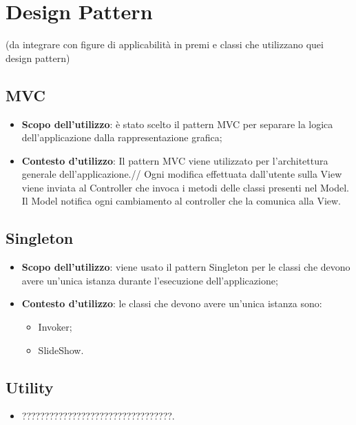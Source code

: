 \section{Design Pattern}{
	(da integrare con figure di applicabilità in premi e classi che utilizzano quei design pattern)
	\begin{figure}
	\end{figure}
	\subsection{MVC}{
			\begin{itemize}
				\item \textbf{Scopo dell’utilizzo}: è stato scelto il pattern MVC per separare la logica dell'applicazione dalla rappresentazione grafica;
				\item \textbf{Contesto d’utilizzo}: Il pattern MVC viene utilizzato per l'architettura generale dell'applicazione.//
				Ogni modifica effettuata dall'utente sulla View viene inviata al Controller che invoca i metodi delle classi presenti nel Model. Il Model notifica ogni cambiamento al controller che la comunica alla View.
			\end{itemize}
		}
		
	\subsection{Singleton}{
		\begin{itemize}
			\item \textbf{Scopo dell’utilizzo}: viene usato il pattern Singleton per le classi che devono avere un'unica istanza durante l'esecuzione dell'applicazione;
			\item \textbf{Contesto d’utilizzo}: le classi che devono avere un’unica istanza sono:
			\begin{itemize}
				\item Invoker;
				\item SlideShow.
			\end{itemize}
		\end{itemize}
	}
	\subsection{Utility}{
		\begin{itemize}
			\item ?????????????????????????????????.
		\end{itemize}
	}
}
